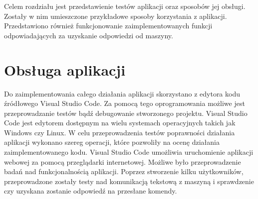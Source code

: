 Celem rozdziału jest przedstawienie testów aplikacji oraz sposobów jej obsługi. Zostały w nim umieszczone przykładowe sposoby korzystania z aplikacji. Przedstawiono również funkcjonowanie zaimplementowanych funkcji odpowiadających za uzyskanie odpowiedzi od maszyny.
\section{Obsługa aplikacji}
Do zaimplementowania całego działania aplikacji skorzystano z edytora kodu źródłowego Visual Studio Code. Za pomocą tego oprogramowania możliwe jest przeprowadzanie testów bądź debugowanie stworzonego projektu. Visual Studio Code jest edytorem dostępnym na wielu systemach operacyjnych takich jak Windows czy Linux. W celu przeprowadzenia testów poprawności działania aplikacji wykonano szereg operacji, które pozwoliły na ocenę działania zaimplementowanego kodu. Visual Studio Code umożliwia uruchomienie aplikacji webowej za pomocą przeglądarki internetowej. Możliwe było przeprowadzenie badań nad funkcjonalnością aplikacji. Poprzez stworzenie kilku użytkowników, przeprowadzone zostały testy nad komunikacją tekstową z maszyną i sprawdzenie czy uzyskana zostanie odpowiedź na przesłane komendy.
